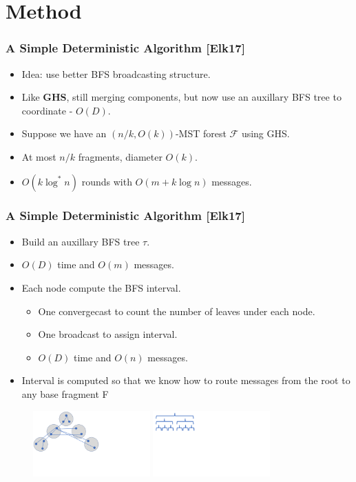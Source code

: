\section{Method}

\begin{frame}
\frametitle{A Simple Deterministic Algorithm [Elk17]}
\begin{itemize}
    \item Idea: use better BFS broadcasting structure.
    \item Like \textbf{GHS}, still merging components, but now use an auxillary BFS tree to coordinate - $O(D)$.
    \item Suppose we have an $(n/k,O(k))$-MST forest $\mathcal{F}$ using GHS. 
    \item At most $n/k$ fragments, diameter $O(k)$.
    \item $O(k \log^*n)$ rounds with $O(m + k \log n)$ messages.
\end{itemize}
\end{frame}

\begin{frame}
\frametitle{A Simple Deterministic Algorithm [Elk17]}
\begin{itemize}
    \item Build an auxillary BFS tree $\tau$.
    \item $O(D)$ time and $O(m)$ messages.
    \item Each node compute the BFS interval.
    \begin{itemize}
        \item One convergecast to count the number of leaves under each node.
        \item One broadcast to assign interval.
        \item $O(D)$ time and $O(n)$ messages.
    \end{itemize}
    \item Interval is computed so that we know how to route messages from the root to any base fragment F
\end{itemize}
\begin{figure}
\centering
\includegraphics[width=0.4\textwidth,trim={0cm 5cm 12cm 0},clip]{figures/bfstree.pdf}
\includegraphics[width=0.4\textwidth,trim={0cm 10cm 20cm 0},clip]{figures/interval.pdf}
\end{figure}
\end{frame}

